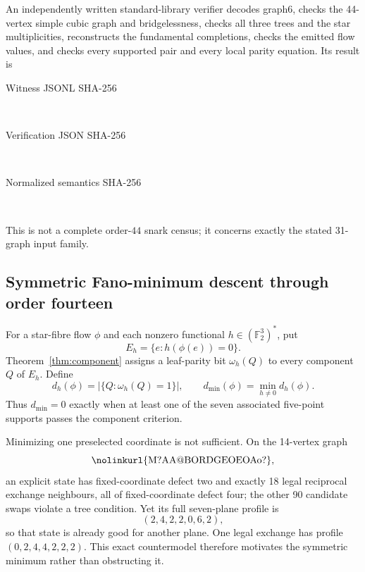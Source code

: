\documentclass[11pt]{article}
\theoremstyle{definition}
\theoremstyle{remark}
\newcommand{\F}{\mathbb F}
\newcommand{\1}{\mathbf 1}
\begin{document}
An independently written standard-library verifier decodes graph6, checks
the 44-vertex simple cubic graph and bridgelessness, checks all three trees
and the star multiplicities, reconstructs the fundamental completions,
checks the emitted flow values, and checks every supported pair and every
local parity equation.  Its result is
\begin{description}
\item[Witness JSONL SHA-256]\hfill\\[-4pt]
{\footnotesize{}}
\item[Verification JSON SHA-256]\hfill\\[-4pt]
{\footnotesize{}}
\item[Normalized semantics SHA-256]\hfill\\[-4pt]
{\footnotesize{}}
\end{description}
This is not a complete order-\(44\) snark census; it concerns exactly the
stated 31-graph input family.

\subsection{Symmetric Fano-minimum descent through order fourteen}
\label{sec:fano-descent}

For a star-fibre flow \(\phi\) and each nonzero functional
\(h\in(\F_2^3)^*\), put
\[
 E_h=\{e:h(\phi(e))=0\}.
\]
Theorem~\ref{thm:component} assigns a leaf-parity bit
\(\omega_h(Q)\) to every component \(Q\) of \(E_h\).  Define
\[
 d_h(\phi)=|\{Q:\omega_h(Q)=1\}|,\qquad
 d_{\min}(\phi)=\min_{h\ne0}d_h(\phi).                  \tag{8.2}
\]
Thus \(d_{\min}=0\) exactly when at least one of the seven associated
five-point supports passes the component criterion.

Minimizing one preselected coordinate is not sufficient.  On the
14-vertex graph
\[
 \text{\nolinkurl{M?AA@BORDGEOEOAo?}},
\]
an explicit state has fixed-coordinate defect two and exactly 18 legal
reciprocal exchange neighbours, all of fixed-coordinate defect four; the
other 90 candidate swaps violate a tree condition.  Yet its full
seven-plane profile is
\[
 (2,4,2,2,0,6,2),
\]
so that state is already good for another plane.  One legal exchange has
profile \((0,2,4,4,2,2,2)\).  This exact countermodel therefore motivates
the symmetric minimum rather than obstructing it.
\end{document}
